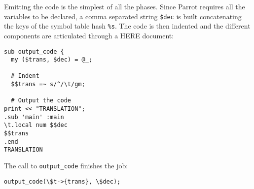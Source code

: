 Emitting the code is the simplest of all the phases.
Since Parrot requires all the variables to be declared,
a comma separated string \verb|$dec|  is built
concatenating the keys of the symbol table hash \verb|%s|.
The code is then indented and the different components
are articulated through a HERE document:
\begin{verbatim}
sub output_code {
  my ($trans, $dec) = @_;

  # Indent
  $$trans =~ s/^/\t/gm;

  # Output the code
print << "TRANSLATION";
.sub 'main' :main
\t.local num $$dec
$$trans
.end
TRANSLATION
\end{verbatim}
The call to \verb|output_code| finishes the job:
\begin{verbatim}
output_code(\$t->{trans}, \$dec);
\end{verbatim}
